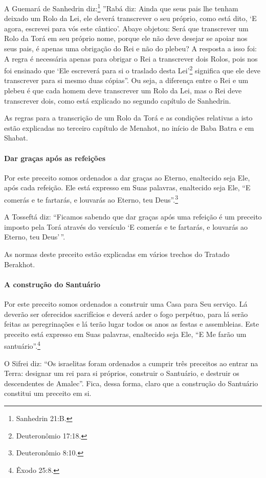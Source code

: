 A Guemará de Sanhedrin diz:\footnote{Sanhedrin 21:B.} ''Rabá diz: Ainda que
seus pais lhe tenham deixado um Rolo da Lei, ele deverá transcrever o seu próprio,
como está dito, `E agora, escrevei para vós este cântico'. Abaye
objetou: Será que transcrever um Rolo da Torá em seu próprio nome,
porque ele não deve desejar se apoiar nos seus pais, é apenas uma
obrigação do Rei e não do plebeu? A resposta a isso foi: A regra é
necessária apenas para obrigar o Rei a transcrever dois Rolos, pois nos
foi ensinado que `Ele escreverá para si o traslado desta Lei'\footnote{Deuteronômio 17:18.} significa que ele deve transcrever para si mesmo
duas cópias''. Ou seja, a diferença entre o Rei e um plebeu é que cada
homem deve transcrever um Rolo da Lei, mas o Rei deve transcrever dois,
como está explicado no segundo capítulo de Sanhedrin.

As regras para a transcrição de um Rolo da Torá e as condições
relativas a isto estão explicadas no terceiro capítulo de Menahot, no
início de Baba Batra e em Shabat.

\paragraph{Dar graças após as refeições}

Por este preceito somos ordenados a dar graças ao Eterno, enaltecido
seja Ele, após cada refeição. Ele está expresso em Suas palavras,
enaltecido seja Ele, ``E comerás e te fartarás, e louvarás ao Eterno,
teu Deus''.\footnote{Deuteronômio 8:10.}

A Tosseftá diz: ``Ficamos sabendo que dar graças após uma refeição é um
preceito imposto pela Torá através do versículo `E comerás e te
fartarás, e louvarás ao Eterno, teu Deus'\,''.

As normas deste preceito estão explicadas em vários trechos do Tratado
Berakhot.

\paragraph{A construção do Santuário}

Por este preceito somos ordenados a construir uma Casa para Seu serviço.
Lá deverão ser oferecidos sacrifícios e deverá arder o fogo perpétuo,
para lá serão feitas as peregrinações e lá terão lugar todos os anos as
festas e assembleias. Este preceito está expresso em Suas palavras,
enaltecido seja Ele, ``E Me farão um santuário''.\footnote{Êxodo 25:8.}

O Sifrei diz: ``Os israelitas foram ordenados a cumprir três preceitos
ao entrar na Terra: designar um rei para si próprios, construir o
Santuário, e destruir os descendentes de Amalec''. Fica, dessa forma,
claro que a construção do Santuário constitui um preceito em si.

